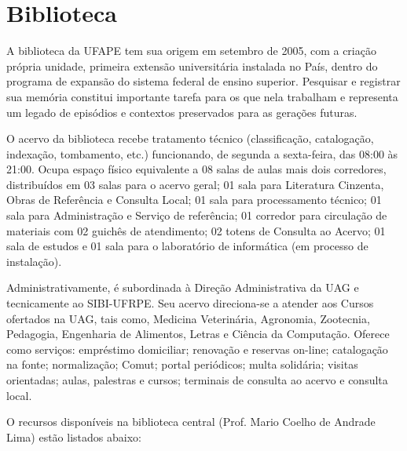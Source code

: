 \documentclass[
	12pt,				%
	openright,			%
  oneside,     %
	a4paper,			%
	chapter=TITLE,		%
	english,			%
	french,				%
	spanish,			%
	brazil				%
	]{abntex2}
\begin{document}
\section{Biblioteca}

A biblioteca da UFAPE tem sua origem em setembro de 2005, com a criação própria unidade, primeira extensão universitária instalada no País, dentro do programa de expansão do sistema federal de ensino superior. Pesquisar e registrar sua memória constitui importante tarefa para os que nela trabalham e representa um legado de episódios e contextos preservados para as gerações futuras.

O acervo da biblioteca recebe tratamento técnico (classificação, catalogação, indexação, tombamento, etc.) funcionando, de segunda a sexta-feira, das 08:00 às 21:00. Ocupa espaço físico equivalente a 08 salas de aulas mais dois corredores, distribuídos em 03 salas para o acervo geral; 01 sala para Literatura Cinzenta, Obras de Referência e Consulta Local; 01 sala para processamento técnico; 01 sala para Administração e Serviço de referência; 01 corredor para circulação de materiais com 02 guichês de atendimento; 02 totens de Consulta ao Acervo; 01 sala de estudos e 01 sala para o laboratório de informática (em processo de instalação).

Administrativamente, é subordinada à Direção Administrativa da UAG e tecnicamente ao SIBI-UFRPE. Seu acervo direciona-se a atender aos Cursos ofertados na UAG, tais como, Medicina Veterinária, Agronomia, Zootecnia, Pedagogia, Engenharia de Alimentos, Letras e Ciência da Computação. Oferece como serviços: empréstimo domiciliar; renovação e reservas on-line; catalogação na fonte; normalização; Comut; portal periódicos; multa solidária; visitas orientadas; aulas, palestras e cursos; terminais de consulta ao acervo e consulta local. 

O recursos disponíveis na biblioteca central (Prof. Mario Coelho de Andrade Lima) estão listados abaixo:
\end{document}
